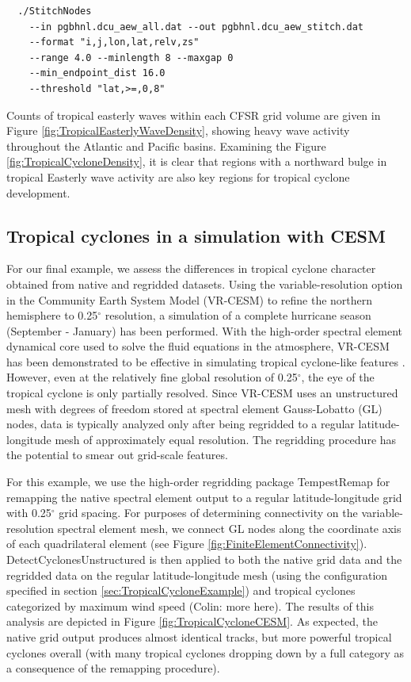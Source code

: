 \documentclass[gmdd, hvmath, online]{copernicus_discussions}
\begin{document}
{\small \begin{verbatim}
  ./StitchNodes
    --in pgbhnl.dcu_aew_all.dat --out pgbhnl.dcu_aew_stitch.dat
    --format "i,j,lon,lat,relv,zs"
    --range 4.0 --minlength 8 --maxgap 0
    --min_endpoint_dist 16.0
    --threshold "lat,>=,0,8"
\end{verbatim}}

Counts of tropical easterly waves within each CFSR grid volume are given in Figure \ref{fig:TropicalEasterlyWaveDensity}, showing heavy wave activity throughout the Atlantic and Pacific basins.  Examining the Figure \ref{fig:TropicalCycloneDensity}, it is clear that regions with a northward bulge in tropical Easterly wave activity are also key regions for tropical cyclone development.

\subsection{Tropical cyclones in a simulation with CESM} \label{sec:TropicalCycloneCESM}

For our final example, we assess the differences in tropical cyclone character obtained from native and regridded datasets.  {\color{red}Using the variable-resolution option in the Community Earth System Model (VR-CESM) to refine the northern hemisphere to 0.25$^\circ$ resolution, a simulation of a complete hurricane season (September - January) has been performed}.  With the high-order spectral element dynamical core used to solve the fluid equations in the atmosphere, VR-CESM has been demonstrated to be effective in simulating tropical cyclone-like features \citep{zarzycki2014multidecadal, zarzycki2014using}.  However, even at the relatively fine global resolution of 0.25$^\circ$, the eye of the tropical cyclone is only partially resolved.  Since VR-CESM uses an unstructured mesh with degrees of freedom stored at spectral element Gauss-Lobatto (GL) nodes, data is typically analyzed only after being regridded to a regular latitude-longitude mesh of approximately equal resolution.  The regridding procedure has the potential to smear out grid-scale features.

For this example, we use the high-order regridding package TempestRemap \citep{ullrich2015arbitrary, ullrich2016arbitrary} for remapping the native spectral element output to a regular latitude-longitude grid with 0.25$^\circ$ grid spacing.  For purposes of determining connectivity on the variable-resolution spectral element mesh, we connect GL nodes along the coordinate axis of each quadrilateral element (see Figure \ref{fig:FiniteElementConnectivity}).  DetectCyclonesUnstructured is then applied to both the native grid data and the regridded data on the regular latitude-longitude mesh (using the configuration specified in section \ref{sec:TropicalCycloneExample}) and tropical cyclones categorized by maximum wind speed {\color{red}(Colin: more here)}.  The results of this analysis are depicted in Figure \ref{fig:TropicalCycloneCESM}.  As expected, the native grid output produces  almost identical tracks, but more powerful tropical cyclones overall (with many tropical cyclones dropping down by a full category as a consequence of the remapping procedure).
\end{document}
